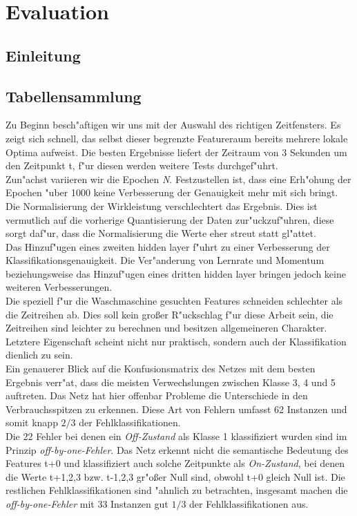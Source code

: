 \section{Evaluation}
\label{Evaluation}

\subsection{Einleitung}
\label{Einleitung}

\subsection{Tabellensammlung}
\label{Tabellensammlung}
Zu Beginn besch"aftigen wir uns mit der Auswahl des richtigen Zeitfensters. Es zeigt sich schnell, das selbst dieser begrenzte Featureraum bereits mehrere lokale Optima aufweist. Die besten Ergebnisse liefert der Zeitraum von 3 Sekunden um den Zeitpunkt t, f"ur diesen werden weitere Tests durchgef"uhrt.\\

Zun"achst variieren wir die Epochen \textit{N}. Festzustellen ist, dass eine Erh"ohung der Epochen "uber 1000 keine Verbesserung der Genauigkeit mehr mit sich bringt. Die Normalisierung der Wirkleistung verschlechtert das Ergebnis. Dies ist vermutlich auf die vorherige Quantisierung der Daten zur"uckzuf"uhren, diese sorgt daf"ur, dass die Normalisierung die Werte eher streut statt gl"attet. \\
Das Hinzuf"ugen eines zweiten hidden layer f"uhrt zu einer Verbesserung der Klassifikationsgenauigkeit. Die Ver"anderung von Lernrate und Momentum beziehungsweise das Hinzuf"ugen eines dritten hidden layer bringen jedoch keine weiteren Verbesserungen.\\

Die speziell f"ur die Waschmaschine gesuchten Features schneiden schlechter als die Zeitreihen ab. Dies soll kein gro{\ss}er R"uckschlag f"ur diese Arbeit sein, die Zeitreihen sind leichter zu berechnen und besitzen allgemeineren Charakter. Letztere Eigenschaft scheint nicht nur praktisch, sondern auch der Klassifikation dienlich zu sein.\\

Ein genauerer Blick auf die Konfusionsmatrix des Netzes mit dem besten Ergebnis verr"at, dass die meisten Verwechslungen zwischen Klasse 3, 4 und 5 auftreten. Das Netz hat hier offenbar Probleme die Unterschiede in den Verbrauchsspitzen zu erkennen. Diese Art von Fehlern umfasst 62 Instanzen und somit knapp $2/3$ der Fehlklassifikationen. \\
Die 22 Fehler bei denen ein \textit{Off-Zustand} als Klasse 1 klassifiziert wurden sind im Prinzip \textit{off-by-one-Fehler}. Das Netz erkennt nicht die semantische Bedeutung des Features t+0 und klassifiziert auch solche Zeitpunkte als \textit{On-Zustand}, bei denen die Werte t+1,2,3 bzw. t-1,2,3 gr"o{\ss}er Null sind, obwohl t+0 gleich Null ist. Die restlichen Fehlklassifikationen sind "ahnlich zu betrachten, insgesamt machen die \textit{off-by-one-Fehler} mit 33 Instanzen gut $1/3$ der Fehlklassifikationen aus. \\


